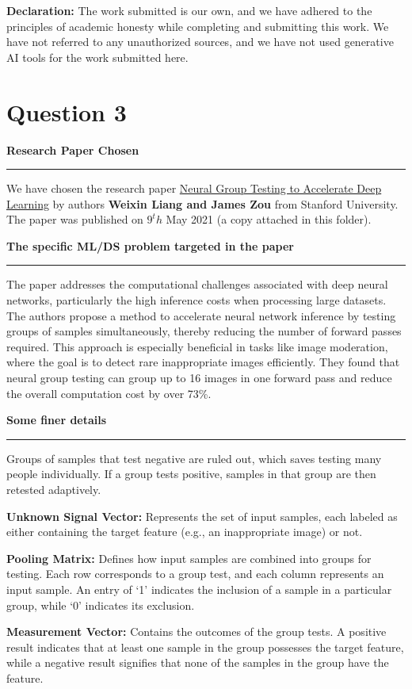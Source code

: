 \documentclass[a4paper,12pt]{article}
\title{\cooltitle{CS754 Assignment-2}}
\author{{\bf Saksham Rathi, Ekansh Ravi Shankar, Kshitij Vaidya}}
\date{}
\newenvironment{solution}[2][]{%
    \begin{mdframed}[linecolor=blue!70!black, linewidth=2pt, roundcorner=10pt, backgroundcolor=yellow!10!white, skipabove=12pt, skipbelow=12pt]%
        \textbf{\large #2}
        \par\noindent\rule{\textwidth}{0.4pt}
}{
    \end{mdframed}
}
\begin{document}
\maketitle
\textbf{Declaration:} The work submitted is our own, and
we have adhered to the principles of academic honesty while completing and submitting this work. We have not referred to any unauthorized sources, and we have not used generative AI tools for the work submitted here.

\section*{Question 3}

\begin{solution}{Research Paper Chosen}
  We have chosen the research paper \href{https://arxiv.org/pdf/2011.10704}{Neural Group Testing to Accelerate Deep Learning} by authors \textbf{Weixin Liang and James Zou} from Stanford University. The paper was published on $9^th$ May 2021 (a copy attached in this folder).
\end{solution}

\begin{solution}{The specific ML/DS problem targeted in the paper}
  The paper addresses the computational challenges associated with deep neural networks, particularly the high inference costs when processing large datasets. The authors propose a method to accelerate neural network inference by testing groups of samples simultaneously, thereby reducing the number of forward passes required. This approach is especially beneficial in tasks like image moderation, where the goal is to detect rare inappropriate images efficiently. They found that neural group testing can group up to 16 images in one forward pass and reduce the overall computation cost by over 73\%.
\end{solution}

\begin{solution}{Some finer details}
  Groups of samples that test negative are ruled out, which saves testing many people individually. If a group tests positive, samples in that group are then retested adaptively.
  
  {\bf Unknown Signal Vector:} Represents the set of input samples, each labeled as either containing the target feature (e.g., an inappropriate image) or not.

  {\bf Pooling Matrix:} Defines how input samples are combined into groups for testing. Each row corresponds to a group test, and each column represents an input sample. An entry of `1' indicates the inclusion of a sample in a particular group, while `0' indicates its exclusion.

  {\bf Measurement Vector:} Contains the outcomes of the group tests. A positive result indicates that at least one sample in the group possesses the target feature, while a negative result signifies that none of the samples in the group have the feature.
\end{solution}
\end{document}
